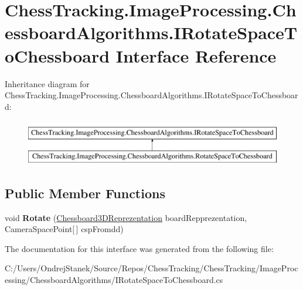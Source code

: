 \hypertarget{interface_chess_tracking_1_1_image_processing_1_1_chessboard_algorithms_1_1_i_rotate_space_to_chessboard}{}\section{Chess\+Tracking.\+Image\+Processing.\+Chessboard\+Algorithms.\+I\+Rotate\+Space\+To\+Chessboard Interface Reference}
\label{interface_chess_tracking_1_1_image_processing_1_1_chessboard_algorithms_1_1_i_rotate_space_to_chessboard}
Inheritance diagram for Chess\+Tracking.\+Image\+Processing.\+Chessboard\+Algorithms.\+I\+Rotate\+Space\+To\+Chessboard\+:\begin{figure}[H]
\begin{center}
\leavevmode
\includegraphics[height=2.000000cm]{interface_chess_tracking_1_1_image_processing_1_1_chessboard_algorithms_1_1_i_rotate_space_to_chessboard}
\end{center}
\end{figure}
\subsection*{Public Member Functions}
\begin{DoxyCompactItemize}
\item 
\mbox{\label{interface_chess_tracking_1_1_image_processing_1_1_chessboard_algorithms_1_1_i_rotate_space_to_chessboard_aca5416c1afe497bc22fc0a24b1f76dd0}} 
void {\bfseries Rotate} (\mbox{\hyperlink{class_chess_tracking_1_1_image_processing_1_1_chessboard_algorithms_1_1_chessboard3_d_reprezentation}{Chessboard3\+D\+Reprezentation}} board\+Repprezentation, Camera\+Space\+Point\mbox{[}$\,$\mbox{]} csp\+Fromdd)
\end{DoxyCompactItemize}


The documentation for this interface was generated from the following file\+:\begin{DoxyCompactItemize}
\item 
C\+:/\+Users/\+Ondrej\+Stanek/\+Source/\+Repos/\+Chess\+Tracking/\+Chess\+Tracking/\+Image\+Processing/\+Chessboard\+Algorithms/I\+Rotate\+Space\+To\+Chessboard.\+cs\end{DoxyCompactItemize}
